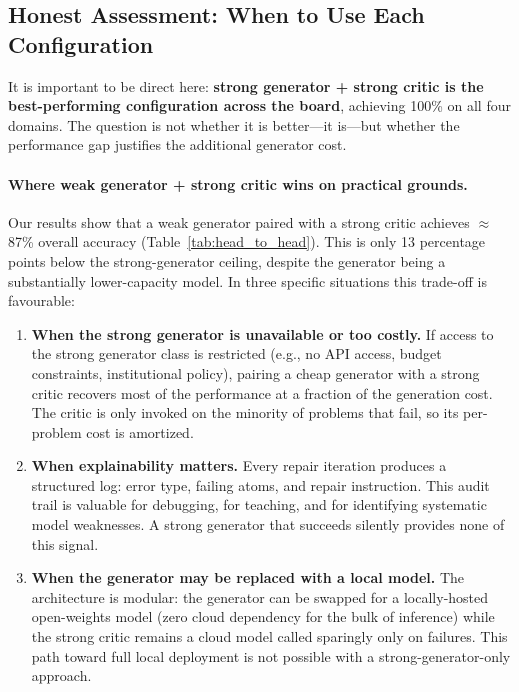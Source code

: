 \documentclass{article}
\begin{document}
\subsection{Honest Assessment: When to Use Each Configuration}
\label{sec:weak_gen_case}

It is important to be direct here: \textbf{strong generator + strong critic is the
best-performing configuration across the board}, achieving 100\% on all four domains.
The question is not whether it is better---it is---but whether the performance gap
justifies the additional generator cost.

\paragraph{Where weak generator + strong critic wins on practical grounds.}
Our results show that a weak generator paired with a strong critic achieves
$\approx$87\% overall accuracy (Table~\ref{tab:head_to_head}).  This is only
13 percentage points below the strong-generator ceiling, despite the generator
being a substantially lower-capacity model.  In three specific situations this
trade-off is favourable:

\begin{enumerate}[leftmargin=1.5em]
  \item \textbf{When the strong generator is unavailable or too costly.}
        If access to the strong generator class is restricted (e.g., no API access,
        budget constraints, institutional policy), pairing a cheap generator with a
        strong critic recovers most of the performance at a fraction of the generation
        cost.  The critic is only invoked on the minority of problems that fail,
        so its per-problem cost is amortized.

  \item \textbf{When explainability matters.}
        Every repair iteration produces a structured log: error type, failing atoms,
        and repair instruction.  This audit trail is valuable for debugging, for
        teaching, and for identifying systematic model weaknesses.  A strong generator
        that succeeds silently provides none of this signal.

  \item \textbf{When the generator may be replaced with a local model.}
        The architecture is modular: the generator can be swapped for a locally-hosted
        open-weights model (zero cloud dependency for the bulk of inference) while the
        strong critic remains a cloud model called sparingly only on failures.  This
        path toward full local deployment is not possible with a strong-generator-only
        approach.
\end{enumerate}
\end{document}
